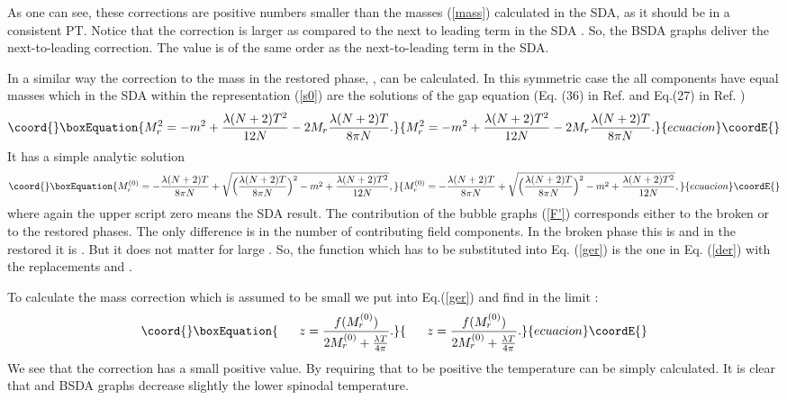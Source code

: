 \documentclass[a4paper,12pt]{article}
\begin{document}
As one can see, these corrections are positive numbers smaller than
the masses (\ref{mass}) calculated in the SDA, as it should be in a
consistent PT. Notice that the correction \coordHE{} is larger as compared to
the next to leading term in the SDA \coordHE{}.  So, the BSDA graphs
deliver the next-to-leading correction. The value \coordHE{} is of the same
order as the next-to-leading term in the SDA.

In a similar way the correction to the mass in the restored phase,
\coordHE{}, can be calculated. In this symmetric case the all
components have equal masses which in the SDA
within the representation (\ref{s0}) are the solutions of the gap
equation (Eq. (36) in Ref.\cite{prd} and Eq.(27) in Ref. \cite{pl})
\begin{equation}\coord{}\boxEquation{ \label{ger}
M_r^2 =  - m^2 + \frac{\lambda (N + 2) T^2}{12 N} - 2 M_r \frac{\lambda
  (N + 2) T}{8 \pi N}.
}{ M_r^2 =  - m^2 + \frac{\lambda (N + 2) T^2}{12 N} - 2 M_r \frac{\lambda
  (N + 2) T}{8 \pi N}.
}{ecuacion}\coordE{}\end{equation}
It has a simple analytic solution
\begin{equation}\coord{}\boxEquation{ \label{mr}
M_r^{(0)} = - \frac{\lambda (N + 2)T}{8 \pi N} + \sqrt{\Bigl(\frac{\lambda
    (N + 2)T}{8 \pi N}\Bigr)^2 - m^2 + \frac{\lambda (N + 2)T^2}{12 N}},
}{ M_r^{(0)} = - \frac{\lambda (N + 2)T}{8 \pi N} + \sqrt{\Bigl(\frac{\lambda
    (N + 2)T}{8 \pi N}\Bigr)^2 - m^2 + \frac{\lambda (N + 2)T^2}{12 N}},
}{ecuacion}\coordE{}\end{equation}
where again the upper script zero means the SDA result. The
contribution of the bubble graphs (\ref{F'}) corresponds either to the
broken or to the restored phases. The only difference is in the number
of contributing field components. In the broken phase this is \coordHE{}
and in the restored it is \coordHE{}. But it does not matter for large \coordHE{}.
So, the function which has to be substituted into Eq. (\ref{ger}) is
the one in Eq. (\ref{der}) with the replacements \coordHE{} and
\coordHE{}.

To calculate the mass correction \coordHE{} which is assumed to be small we
put \coordHE{} into Eq.(\ref{ger}) and find in the limit
\coordHE{}:
\begin{equation}\coord{}\boxEquation{ \label{z}
~~~~~z = \frac{ f(M^{(0)}_{r})}{2 M^{(0)}_{r} + \frac{\lambda T}{ 4
      \pi} }.
}{ ~~~~~z = \frac{ f(M^{(0)}_{r})}{2 M^{(0)}_{r} + \frac{\lambda T}{ 4
      \pi} }.
}{ecuacion}\coordE{}\end{equation}
We see that the correction has a small positive value. By requiring
that \coordHE{} to be positive the temperature \coordHE{} can be simply
calculated. It is clear that \coordHE{} and BSDA graphs
decrease slightly the lower spinodal temperature.
\end{document}
